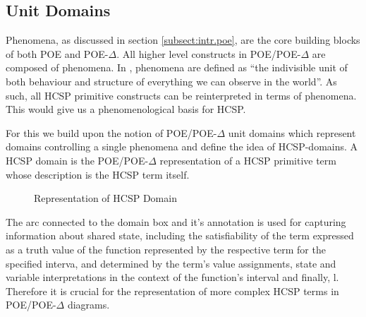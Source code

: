 \documentclass[runningheads,a4paper]{llncs}
\begin{document}
             \subsection{Unit Domains}
             \label{subsect:phenomhcsp.singlePhenDom}
             Phenomena, as discussed in section
             \ref{subsect:intr.poe}, are the core building blocks of
             both POE and POE-$\Delta$. All higher level constructs%
             in POE/POE-$\Delta$ are composed of phenomena. In
             \cite{hall2003reference}, phenomena are defined as ``the
             indivisible unit of both behaviour and structure of
             everything we can observe in the world''. As such, all
             HCSP primitive constructs%
             can be reinterpreted in terms of phenomena. This would
             give us a phenomenological basis for HCSP.

             For this we build upon the notion of POE/POE-$\Delta$
             unit domains which represent domains controlling a single
             phenomena and define the idea of HCSP-domains. A HCSP
             domain is the POE/POE-$\Delta$ representation of a HCSP
             primitive term whose description is the HCSP term itself.

             \begin{figure}[hbt]
               \caption{Representation of HCSP Domain}
               \label{fig:HCSPDomain}
             \end{figure}

             The arc connected to the domain box and it's annotation
             is used for capturing information about shared state,
             including the satisfiability of the term expressed as a
             truth value of the function represented by the respective
             term for the specified interva, and determined by the
             term's value assignments, state and variable
             interpretations in the context of the function's interval
             and finally, l. Therefore it is crucial for the
             representation of more complex HCSP terms in
             POE/POE-$\Delta$ diagrams.
             
\end{document}
